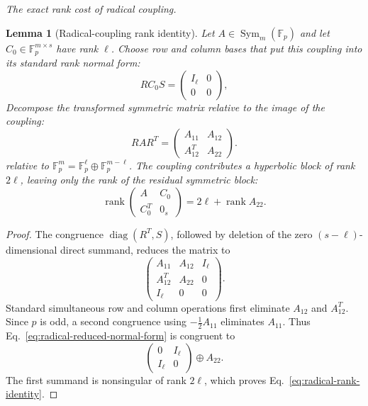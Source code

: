 \documentclass[11pt]{article}
\newcommand{\F}{\mathbb F}
\newcommand{\Sym}{\operatorname{Sym}}
\newcommand{\rank}{\operatorname{rank}}
\newcommand{\1}{\mathbf 1}
\theoremstyle{plain}
\newtheorem{lemma}[theorem]{Lemma}
\theoremstyle{definition}
\theoremstyle{remark}
\begin{document}
\medskip\noindent\emph{The exact rank cost of radical coupling.}\par
\begin{lemma}[Radical-coupling rank identity]
\label{lem:radical-rank-identity}
Let $A\in\Sym_m(\F_p)$ and let $C_0\in\F_p^{m\times s}$ have rank
$\ell$.  Choose row and column bases that put this coupling into its standard
rank normal form:
\begin{equation}
 RC_0S=\begin{pmatrix}I_\ell&0\\0&0\end{pmatrix},
 \label{eq:radical-lemma-normal-form}
\end{equation}
Decompose the transformed symmetric matrix relative to the image of the
coupling:
\begin{equation}
 RAR^T=\begin{pmatrix}A_{11}&A_{12}\\A_{12}^T&A_{22}\end{pmatrix}.
 \label{eq:radical-lemma-A-split}
\end{equation}
relative to $\F_p^m=\F_p^\ell\oplus\F_p^{m-\ell}$.  The coupling contributes a hyperbolic block of rank $2\ell$, leaving only the
rank of the residual symmetric block:
\begin{equation}
 \rank\begin{pmatrix}A&C_0\\C_0^T&0_s\end{pmatrix}
 =2\ell+\rank A_{22}.
 \label{eq:radical-rank-identity}
\end{equation}
\end{lemma}
\begin{proof}
The congruence $\operatorname{diag}(R^T,S)$, followed by deletion of the zero
$(s-\ell)$-dimensional direct summand, reduces the matrix to
\begin{equation}
 \begin{pmatrix}
 A_{11}&A_{12}&I_\ell\\
 A_{12}^T&A_{22}&0\\
 I_\ell&0&0
 \end{pmatrix}.
 \label{eq:radical-reduced-normal-form}
\end{equation}
Standard simultaneous row and column operations first eliminate
$A_{12}$ and $A_{12}^T$.  Since $p$ is odd, a second congruence using
$-\frac12A_{11}$ eliminates $A_{11}$.  Thus
Eq.~\eqref{eq:radical-reduced-normal-form} is congruent to
\begin{equation}
 \begin{pmatrix}0&I_\ell\\I_\ell&0\end{pmatrix}
 \oplus A_{22}.
 \label{eq:radical-hyperbolic-direct-sum}
\end{equation}
The first summand is nonsingular of rank $2\ell$, which proves
Eq.~\eqref{eq:radical-rank-identity}.
\end{proof}
\end{document}
